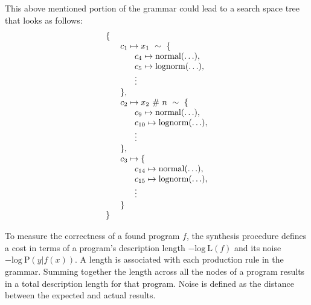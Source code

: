 \documentclass[runningheads]{llncs}
\begin{document}
This above mentioned portion of the grammar could lead to a search space tree that looks as follows:
\[
  \begin{array}{l }
    \{ \\
    \hspace{6mm} c_1 \mapsto x_1\ \sim\ \{ \\
        \hspace{12mm} c_4 \mapsto \text{normal}(\hdots), \\
        \hspace{12mm} c_5 \mapsto \text{lognorm}(\hdots), \\ 
        \hspace{12mm} \vdots \\
    \hspace{6mm}\},\\
    \hspace{6mm} c_2 \mapsto x_2\ \#\ n\ \sim\ \{ \\
        \hspace{12mm} c_9 \mapsto \text{normal}(\hdots), \\
        \hspace{12mm} c_{10} \mapsto \text{lognorm}(\hdots), \\ 
        \hspace{12mm} \vdots \\
    \hspace{6mm}\},\\
    \hspace{6mm} c_3 \mapsto \{ \\
        \hspace{12mm} c_{14} \mapsto \text{normal}(\hdots), \\
        \hspace{12mm} c_{15} \mapsto \text{lognorm}(\hdots), \\ 
        \hspace{12mm} \vdots \\
    \hspace{6mm}\}\\
    \}
    
  \end{array}
\]

To measure the correctness of a found program $f$, 
the synthesis procedure defines a cost in terms of a program's
description length $-\text{log}\ \text{L}(f)$ and its noise $-\text{log}\ \text{P}(y|f(x)) $.
A length is associated with each production rule in the grammar.
Summing together the length across all the nodes of a program results 
in a total description length for that program. 
Noise is defined as the distance between the expected and actual results.
\end{document}
